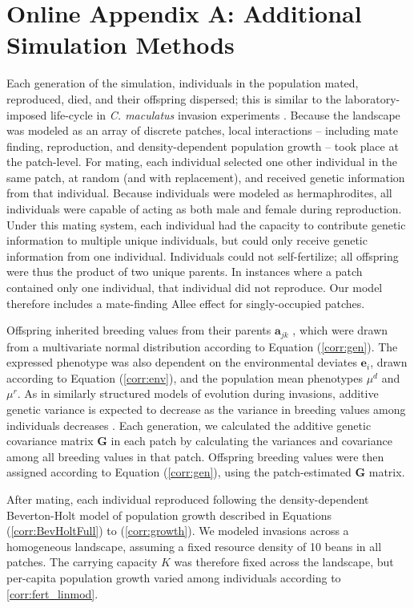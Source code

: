 \documentclass[11pt]{article}
\begin{document}
\section*{Online Appendix A: Additional Simulation Methods}
Each generation of the simulation, individuals in the population mated, reproduced, died, and their offspring dispersed; this is similar to the laboratory-imposed life-cycle in \textit{C. maculatus} invasion experiments \citep{miller_sex_2013,wagner_genetic_2016,ochocki_rapid_2017}.
Because the landscape was modeled as an array of discrete patches, local interactions -- including mate finding, reproduction, and density-dependent population growth -- took place at the patch-level.
For mating, each individual selected one other individual in the same patch, at random (and with replacement), and received genetic information from that individual.
Because individuals were modeled as hermaphrodites, all individuals were capable of acting as both male and female during reproduction.
Under this mating system, each individual had the capacity to contribute genetic information to multiple unique individuals, but could only receive genetic information from one individual.
Individuals could not self-fertilize; all offspring were thus the product of two unique parents.
In instances where a patch contained only one individual, that individual did not reproduce.
Our model therefore includes a mate-finding Allee effect for singly-occupied patches.

Offspring inherited breeding values from their parents $\bm{a}_{jk}$ , which were drawn from a multivariate normal distribution according to Equation (\ref{corr:gen}).
The expressed phenotype was also dependent on the environmental deviates $\bm{e}_{i}$, drawn according to Equation (\ref{corr:env}), and the population mean phenotypes $\mu^{d}$ and $\mu^{r}$.
As in similarly structured models of evolution during invasions, additive genetic variance is expected to decrease as the variance in breeding values among individuals decreases \citep{phillips_evolutionary_2015}.
Each generation, we calculated the additive genetic covariance matrix $\bm{G}$ in each patch by calculating the variances and covariance among all breeding values in that patch.
Offspring breeding values were then assigned according to Equation (\ref{corr:gen}), using the patch-estimated $\bm{G}$ matrix.

After mating, each individual reproduced following the density-dependent Beverton-Holt model of population growth described in Equations (\ref{corr:BevHoltFull}) to (\ref{corr:growth}).
We modeled invasions across a homogeneous landscape, assuming a fixed resource density of 10 beans in all patches. The carrying capacity $K$ was therefore fixed across the landscape, but per-capita population growth varied among individuals according to \ref{corr:fert_linmod}.
\end{document}
